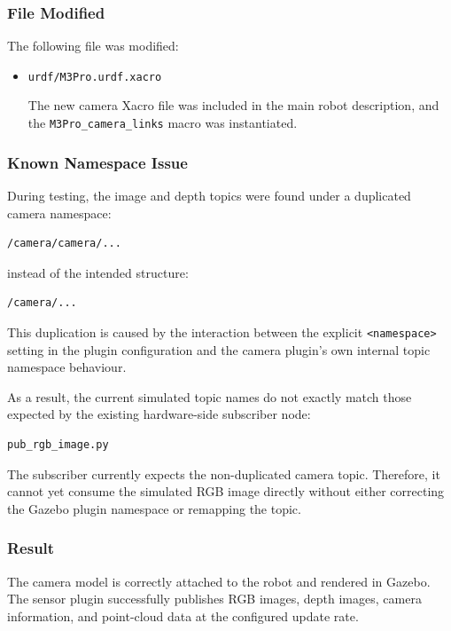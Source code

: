 \documentclass{article}
\begin{document}
\subsubsection{File Modified}

The following file was modified:

\begin{itemize}
    \item \texttt{urdf/M3Pro.urdf.xacro}

    The new camera Xacro file was included in the main robot description, and the \texttt{M3Pro\_camera\_links} macro was instantiated.
\end{itemize}

\subsubsection{Known Namespace Issue}

During testing, the image and depth topics were found under a duplicated camera namespace:

\begin{verbatim}
/camera/camera/...
\end{verbatim}

instead of the intended structure:

\begin{verbatim}
/camera/...
\end{verbatim}

This duplication is caused by the interaction between the explicit \texttt{<namespace>} setting in the plugin configuration and the camera plugin's own internal topic namespace behaviour.

As a result, the current simulated topic names do not exactly match those expected by the existing hardware-side subscriber node:

\begin{verbatim}
pub_rgb_image.py
\end{verbatim}

The subscriber currently expects the non-duplicated camera topic. Therefore, it cannot yet consume the simulated RGB image directly without either correcting the Gazebo plugin namespace or remapping the topic.

\subsubsection{Result}

The camera model is correctly attached to the robot and rendered in Gazebo. The sensor plugin successfully publishes RGB images, depth images, camera information, and point-cloud data at the configured update rate.
\end{document}
